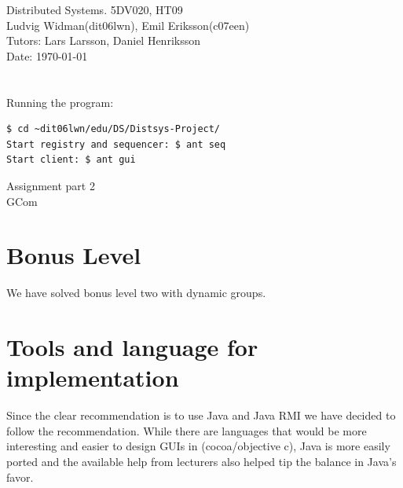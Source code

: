 \documentclass[english]{article}
\def\author			{Ludvig Widman(dit06lwn), Emil Eriksson(c07een)}
\def\course			{Distributed Systems. 5DV020, HT09}
\def\delivery		{Assignment part 2}
\def\trivialname	{GCom}
\def\tutor			{Lars Larsson, Daniel Henriksson}
\begin{document}
\begin{titlepage}
\noindent
\course \\
\author \\

\noindent
Tutors: \tutor \\
Date: \today \\
\\
\\
Running the program: 
\begin{verbatim}
$ cd ~dit06lwn/edu/DS/Distsys-Project/
Start registry and sequencer: $ ant seq
Start client: $ ant gui
\end{verbatim}

\begin{center}
	\vspace{20mm}
        \Huge \delivery \\
        \vspace{5mm}
        \Huge \trivialname \\
        \vspace{20mm}
        
\end{center}

\end{titlepage}
\thispagestyle{empty}
\tableofcontents
\newpage
{}

\setlength{\parindent}{0pt}
\setlength{\parskip}{1ex plus 0.5ex minus 0.2ex}


\section{Bonus Level}
We have solved bonus level two with dynamic groups. 


\section{Tools and language for implementation}
Since the clear recommendation is to use Java and Java RMI we have decided to follow the recommendation. While there are languages that would be more interesting and easier to design GUIs in (cocoa/objective c), Java is more easily ported and the available help from lecturers also helped tip the balance in Java's favor.
\end{document}
